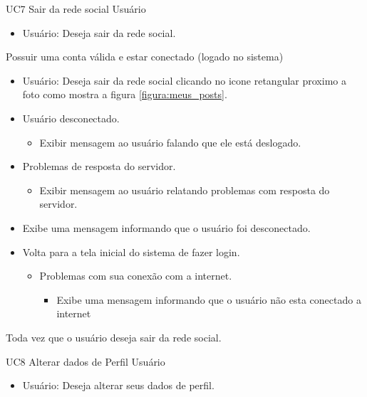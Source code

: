 \casoDeUso
{UC7}
{Sair da rede social}
{Usuário}
{
\begin{itemize}
	\item Usuário: Deseja sair da rede social.
\end{itemize}
}
{Possuir uma conta válida e estar conectado (logado no sistema)}
{}
{
\begin{itemize}
	\item Usuário: Deseja sair da rede social clicando no icone retangular proximo a foto como mostra a figura  \ref{figura:meus_posts}.
\end{itemize}
}
{
\begin{itemize}
	\item Usuário desconectado.
		\begin{itemize}
		\item Exibir mensagem  ao usuário falando que ele está deslogado.
	\end{itemize}
	\item Problemas de resposta do servidor.
		\begin{itemize}
		\item Exibir mensagem  ao usuário relatando problemas com resposta do servidor.
	\end{itemize}
	\item Exibe uma mensagem informando que o usuário foi desconectado.
	\item Volta para a tela inicial do sistema de fazer login.
		\begin{itemize}
	\item Problemas com sua conexão com a internet.
		\begin{itemize}
		\item Exibe uma mensagem informando que o usuário não esta conectado a internet
	\end{itemize}
\end{itemize}
	
\end{itemize}
}
{Toda vez que o usuário deseja sair da rede social.}
{

}
\casoDeUso
{UC8}
{Alterar dados de Perfil}
{Usuário}
{
\begin{itemize}
	\item Usuário: Deseja alterar seus dados de perfil.	
\end{itemize}
}

